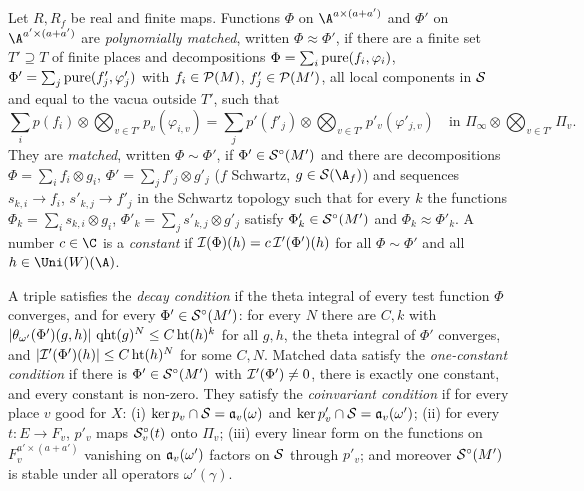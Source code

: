 \begin{definition}\label{pf:thmK:def:match}
Let $R,R_f$ be real and finite maps. Functions $\Phi$ on $\A^{a\times(a+a')}$ and $\Phi'$ on $\A^{a'\times(a+a')}$ are
\emph{polynomially matched}, written $\Phi\approx\Phi'$, if there are a finite set $T'\supseteq T$ of finite places and
decompositions $\Phi=\sum_i\operatorname{pure}(f_i,\varphi_i)$, $\Phi'=\sum_j\operatorname{pure}(f'_j,\varphi'_j)$ with $f_i\in\mathcal{P}(M)$,
$f'_j\in\mathcal{P}(M')$, all local components in $\mathcal{S}$ and equal to the vacua outside $T'$, such that
\begin{equation}\label{pf:thmK:eq:polmatch}
\sum_ip(f_i)\otimes\bigotimes_{v\in T'}p_v(\varphi_{i,v})=\sum_jp'(f'_j)\otimes\bigotimes_{v\in T'}p'_v(\varphi'_{j,v})
\quad\text{in }\Pi_\infty\otimes\textstyle\bigotimes_{v\in T'}\Pi_v.
\end{equation}
They are \emph{matched}, written $\Phi\sim\Phi'$, if $\Phi'\in\mathcal{S}^{\circ}(M')$ and there are decompositions
$\Phi=\sum_if_i\otimes g_i$, $\Phi'=\sum_jf'_j\otimes g'_j$ ($f$ Schwartz, $g\in\thmKS(\A_f)$) and sequences
$s_{k,i}\to f_i$, $s'_{k,j}\to f'_j$ in the Schwartz topology such that for every $k$ the functions
$\Phi_k=\sum_is_{k,i}\otimes g_i$, $\Phi'_k=\sum_js'_{k,j}\otimes g'_j$ satisfy $\Phi'_k\in\mathcal{S}^{\circ}(M')$ and
$\Phi_k\approx\Phi'_k$. A number $c\in\C$ is a \emph{constant} if $\mathcal{I}(\Phi)(h)=c\,\mathcal{I}'(\Phi')(h)$ for all
$\Phi\sim\Phi'$ and all $h\in\Uni(W)(\A)$.
\end{definition}

\begin{definition}\label{pf:thmK:def:decay}
A triple satisfies the \emph{decay condition} if the theta integral of every test function $\Phi$ converges, and for every
$\Phi'\in\mathcal{S}^{\circ}(M')$: for every $N$ there are $C,k$ with $|\theta_{\omega'}(\Phi')(g,h)|\,\operatorname{qht}(g)^N\le
C\operatorname{ht}(h)^k$ for all $g,h$, the theta integral of $\Phi'$ converges, and $|\mathcal{I}'(\Phi')(h)|\le C\operatorname{ht}(h)^N$ for
some $C,N$. Matched data satisfy the \emph{one-constant condition} if there is $\Phi'\in\mathcal{S}^{\circ}(M')$ with
$\mathcal{I}'(\Phi')\ne0$, there is exactly one constant, and every constant is non-zero. They satisfy the \emph{coinvariant
condition} if for every place $v$ good for $X$: (i) $\ker p_v\cap\mathcal{S}=\mathfrak{a}_v(\omega)$ and $\ker p'_v\cap\mathcal{S}=
\mathfrak{a}_v(\omega')$; (ii) for every $t\colon E\to F_v$, $p'_v$ maps $\mathcal{S}^{\circ}_v(t)$ onto $\Pi_v$; (iii) every linear form on
the functions on $F_v^{a'\times(a+a')}$ vanishing on $\mathfrak{a}_v(\omega')$ factors on $\mathcal{S}$ through $p'_v$; and
moreover $\mathcal{S}^{\circ}(M')$ is stable under all operators $\omega'(\gamma)$.
\end{definition}

